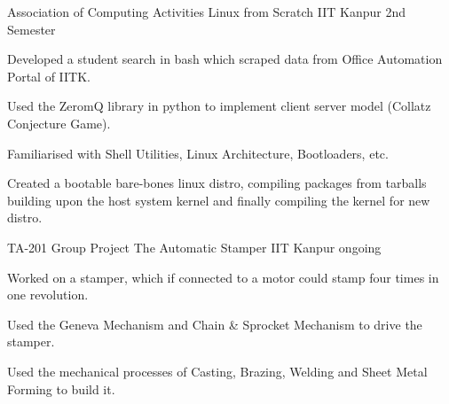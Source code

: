 
\begin{cventries}

  \cventry
  {Association of Computing Activities}
		{Linux from Scratch}
  {IIT Kanpur}
  {2nd Semester}
  {
    \begin{cvitems}
    \item Developed a student search in bash which scraped data from Office Automation Portal of IITK.
    \item Used the ZeromQ library in python to implement client server model (Collatz Conjecture Game).
    \item Familiarised with Shell Utilities, Linux Architecture, Bootloaders, etc.
		\item Created a bootable bare-bones linux distro, compiling packages from tarballs building upon the host system kernel and finally compiling the kernel for new distro.
    \end{cvitems}
  }

  \cventry
  {TA-201 Group Project}
		{The Automatic Stamper}
  {IIT Kanpur}
  {ongoing}
  {
    \begin{cvitems}
    \item Worked on a stamper, which if connected to a motor could stamp four times in one revolution.
		\item Used the Geneva Mechanism and Chain \& Sprocket Mechanism to drive the stamper.
    \item Used the mechanical processes of Casting, Brazing, Welding and Sheet Metal Forming to build it.
    \end{cvitems}
  }

\end{cventries}

